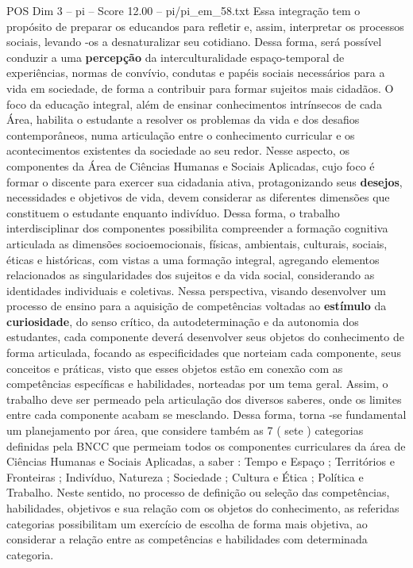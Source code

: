 \begin{textsample}{POS Dim 3 – pi – Score 12.00 – pi/pi\_em\_58.txt}
Essa integração tem o propósito de preparar os educandos para refletir e, assim, interpretar os processos sociais, levando -os a desnaturalizar seu cotidiano.
Dessa forma, será possível conduzir a uma \textbf{percepção} da interculturalidade espaço-temporal de experiências, normas de convívio, condutas e papéis sociais necessários para a vida em sociedade, de forma a contribuir para formar sujeitos mais cidadãos.
O foco da educação integral, além de ensinar conhecimentos intrínsecos de cada Área, habilita o estudante a resolver os problemas da vida e dos desafios contemporâneos, numa articulação entre o conhecimento curricular e os acontecimentos existentes da sociedade ao seu redor.
Nesse aspecto, os componentes da Área de Ciências Humanas e Sociais Aplicadas, cujo foco é formar o discente para exercer sua cidadania ativa, protagonizando seus \textbf{desejos}, necessidades e objetivos de vida, devem considerar as diferentes dimensões que constituem o estudante enquanto indivíduo.
Dessa forma, o trabalho interdisciplinar dos componentes possibilita compreender a formação cognitiva articulada as dimensões socioemocionais, físicas, ambientais, culturais, sociais, éticas e históricas, com vistas a uma formação integral, agregando elementos relacionados as singularidades dos sujeitos e da vida social, considerando as identidades individuais e coletivas.
Nessa perspectiva, visando desenvolver um processo de ensino para a aquisição de competências voltadas ao \textbf{estímulo} da \textbf{curiosidade}, do senso crítico, da autodeterminação e da autonomia dos estudantes, cada componente deverá desenvolver seus objetos do conhecimento de forma articulada, focando as especificidades que norteiam cada componente, seus conceitos e práticas, visto que esses objetos estão em conexão com as competências específicas e habilidades, norteadas por um tema geral.
Assim, o trabalho deve ser permeado pela articulação dos diversos saberes, onde os limites entre cada componente acabam se mesclando.
Dessa forma, torna -se fundamental um planejamento por área, que considere também as 7 ( sete ) categorias definidas pela BNCC que permeiam todos os componentes curriculares da área de Ciências Humanas e Sociais Aplicadas, a saber : Tempo e Espaço ; Territórios e Fronteiras ; Indivíduo, Natureza ; Sociedade ; Cultura e Ética ; Política e Trabalho.
Neste sentido, no processo de definição ou seleção das competências, habilidades, objetivos e sua relação com os objetos do conhecimento, as referidas categorias possibilitam um exercício de escolha de forma mais objetiva, ao considerar a relação entre as competências e habilidades com determinada categoria.

\end{textsample}
